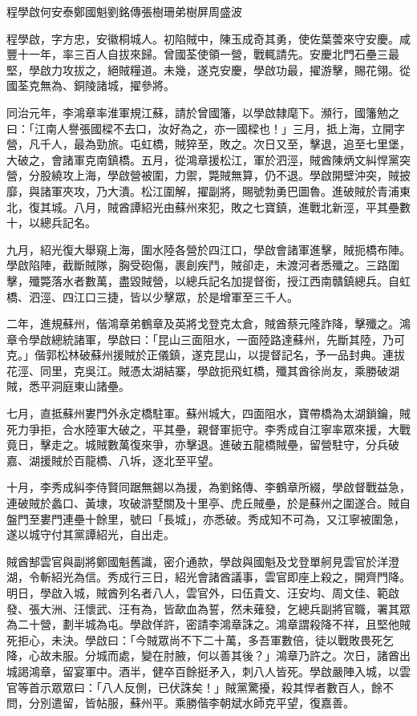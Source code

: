 
\begin{pinyinscope}
程學啟何安泰鄭國魁劉銘傳張樹珊弟樹屏周盛波

程學啟，字方忠，安徽桐城人。初陷賊中，陳玉成奇其勇，使佐葉蕓來守安慶。咸豐十一年，率三百人自拔來歸。曾國荃使領一營，戰輒請先。安慶北門石壘三最堅，學啟力攻拔之，絕賊糧道。未幾，遂克安慶，學啟功最，擢游擊，賜花翎。從國荃克無為、銅陵諸城，擢參將。

同治元年，李鴻章率淮軍規江蘇，請於曾國籓，以學啟隸麾下。瀕行，國籓勉之曰：「江南人譽張國樑不去口，汝好為之，亦一國樑也！」三月，抵上海，立開字營，凡千人，最為勁旅。屯虹橋，賊猝至，敗之。次日又至，擊退，追至七里堡，大破之，會諸軍克南鎮橋。五月，從鴻章援松江，軍於泗涇，賊酋陳炳文糾悍黨突營，分股繞攻上海，學啟營被圍，力禦，斃賊無算，仍不退。學啟開壁沖突，賊披靡，與諸軍夾攻，乃大潰。松江圍解，擢副將，賜號勃勇巴圖魯。進破賊於青浦東北，復其城。八月，賊酋譚紹光由蘇州來犯，敗之七寶鎮，進戰北新涇，平其壘數十，以總兵記名。

九月，紹光復大舉窺上海，圍水陸各營於四江口，學啟會諸軍進擊，賊扼橋布陣。學啟陷陣，截斷賊隊，胸受砲傷，裹創疾鬥，賊卻走，未渡河者悉殲之。三路圍擊，殲斃落水者數萬，盡毀賊營，以總兵記名加提督銜，授江西南贛鎮總兵。自虹橋、泗涇、四江口三捷，皆以少擊眾，於是增軍至三千人。

二年，進規蘇州，偕鴻章弟鶴章及英將戈登克太倉，賊酋蔡元隆詐降，擊殲之。鴻章令學啟總統諸軍，學啟曰：「昆山三面阻水，一面陸路達蘇州，先斷其陸，乃可克。」偕郭松林破蘇州援賊於正儀鎮，遂克昆山，以提督記名，予一品封典。連拔花涇、同里，克吳江。賊憑太湖結寨，學啟扼飛虹橋，殲其酋徐尚友，乘勝破湖賊，悉平洞庭東山諸壘。

七月，直抵蘇州婁門外永定橋駐軍。蘇州城大，四面阻水，寶帶橋為太湖鎖鑰，賊死力爭拒，合水陸軍大破之，平其壘，親督軍扼守。李秀成自江寧率眾來援，大戰竟日，擊走之。城賊數萬復來爭，亦擊退。進破五龍橋賊壘，留營駐守，分兵破嘉、湖援賊於百龍橋、八坼，逐北至平望。

十月，李秀成糾李侍賢同踞無錫以為援，為劉銘傳、李鶴章所綴，學啟督戰益急，連破賊於蠡口、黃埭，攻破滸墅關及十里亭、虎丘賊壘，於是蘇州之圍遂合。賊自盤門至婁門連壘十餘里，號曰「長城」，亦悉破。秀成知不可為，又江寧被圍急，遂以城守付其黨譚紹光，自出走。

賊酋郜雲官與副將鄭國魁舊識，密介通款，學啟與國魁及戈登單舸見雲官於洋澄湖，令斬紹光為信。秀成行三日，紹光會諸酋議事，雲官即座上殺之，開齊門降。明日，學啟入城，賊酋列名者八人，雲官外，曰伍貴文、汪安均、周文佳、範啟發、張大洲、汪懷武、汪有為，皆歃血為誓，然未薙發，乞總兵副將官職，署其眾為二十營，劃半城為屯。學啟佯許，密請李鴻章誅之。鴻章謂殺降不祥，且堅他賊死拒心，未決。學啟曰：「今賊眾尚不下二十萬，多吾軍數倍，徒以戰敗畏死乞降，心故未服。分城而處，變在肘腋，何以善其後？」鴻章乃許之。次日，諸酋出城謁鴻章，留宴軍中。酒半，健卒百餘挺矛入，刺八人皆死。學啟嚴陣入城，以雲官等首示眾眾曰：「八人反側，已伏誅矣！」賊黨驚擾，殺其悍者數百人，餘不問，分別遣留，皆帖服，蘇州平。乘勝偕李朝斌水師克平望，復嘉善。


\end{pinyinscope}
